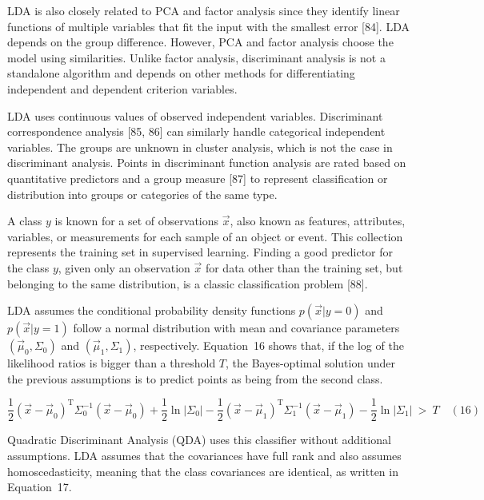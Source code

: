 \documentclass[preprint,12pt]{elsarticle}
\begin{document}
LDA is also closely related to PCA and factor analysis since they identify linear functions of multiple variables that fit the input with the smallest error [84]. LDA depends on the group difference. However, PCA and factor analysis choose the model using similarities. Unlike factor analysis, discriminant analysis is not a standalone algorithm and depends on other methods for differentiating independent and dependent criterion variables.

LDA uses continuous values of observed independent variables. Discriminant correspondence analysis [85, 86] can similarly handle categorical independent variables. The groups are unknown in cluster analysis, which is not the case in discriminant analysis. Points in discriminant function analysis are rated based on quantitative predictors and a group measure [87] to represent classification or distribution into groups or categories of the same type.

A class $y$ is known for a set of observations $\vec{x}$, also known as features, attributes, variables, or measurements for each sample of an object or event. This collection represents the training set in supervised learning. Finding a good predictor for the class $y$, given only an observation $\vec{x}$ for data other than the training set, but belonging to the same distribution, is a classic classification problem [88].

LDA assumes the conditional probability density functions $p({\vec{x}}|y=0)$ and $p({\vec{x}}|y=1)$ follow a normal distribution with mean and covariance parameters $\left({\vec{\mu}}_{0},\Sigma_{0}\right)$ and $\left({\vec{\mu}}_{1},\Sigma_{1}\right)$, respectively. Equation~16 shows that, if the log of the likelihood ratios is bigger than a threshold $T$, the Bayes-optimal solution under the previous assumptions is to predict points as being from the second class.

\begin{equation}
	{\frac{1}{2}}({\vec{x}}-{\vec{\mu}}_{0})^{\mathrm{T}}\Sigma_{0}^{-1}({\vec{x}}-{\vec{\mu}}_{0})+{\frac{1}{2}}\ln |\Sigma_{0}|-{\frac{1}{2}}({\vec{x}}-{\vec{\mu}}_{1})^{\mathrm{T}}\Sigma_{1}^{-1}({\vec{x}}-{\vec{\mu}}_{1})-{\frac{1}{2}}\ln |\Sigma_{1}|\ >\ T
	\quad\left(16\right)
\end{equation}

Quadratic Discriminant Analysis (QDA) uses this classifier without additional assumptions. LDA assumes that the covariances have full rank and also assumes homoscedasticity, meaning that the class covariances are identical, as written in Equation~17.
\end{document}

